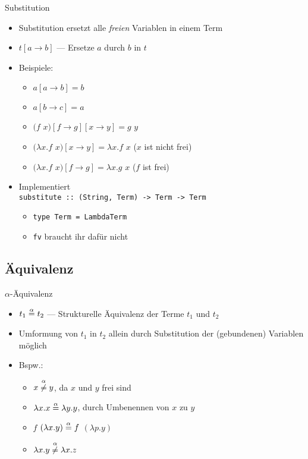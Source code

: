 \documentclass{beamer}
\begin{document}
\begin{frame}{Substitution}
	\begin{itemize}
		\item Substitution ersetzt alle \emph{freien} Variablen in einem Term
		\item $t\left[a \to b\right]$ --- Ersetze $a$ durch $b$ in $t$
		\item Beispiele:
		\begin{itemize}
			\item $a\left[a \to b\right] = b$
			\item $a\left[b \to c\right] = a$
			\item $(f$ $x)\left[f \to g\right]\left[x \to y\right] = g$ $y$
			\pause
			\item $(\lambda{}x.f$ $x)\left[x \to y\right] = \lambda{}x.f$ $x$ ($x$ ist nicht frei)
			\item $(\lambda{}x.f$ $x)\left[f \to g\right] = \lambda{}x.g$ $x$ ($f$ ist frei)
		\end{itemize}
		\pause
		\item Implementiert\\
		      \texttt{substitute :: (String, Term) -> Term -> Term}
		\begin{itemize}
			\item \texttt{type Term = LambdaTerm}
			\item \texttt{fv} braucht ihr dafür nicht
		\end{itemize}
	\end{itemize}
\end{frame}

\subsection{Äquivalenz}

\begin{frame}{$\alpha$-Äquivalenz}
	\begin{itemize}
		\item $t_1 \stackrel{\alpha}{=} t_2$ --- Strukturelle Äquivalenz der Terme $t_1$ und $t_2$
		\item Umformung von $t_1$ in $t_2$ allein durch Substitution der (gebundenen) Variablen möglich
		\pause
		\item Bspw.:
		\begin{itemize}
			\item $x \stackrel{\alpha}{\neq} y$, da $x$ und $y$ frei sind
			\item $\lambda{}x.x \stackrel{\alpha}{=} \lambda{}y.y$, durch Umbenennen von $x$ zu $y$
			\item $f$ $(\lambda{}x.y) \stackrel{\alpha}{=} f$ $(\lambda{}p.y)$
			\item $\lambda{}x.y \stackrel{\alpha}{\neq} \lambda{}x.z$
		\end{itemize}
	\end{itemize}
\end{frame}
\end{document}
